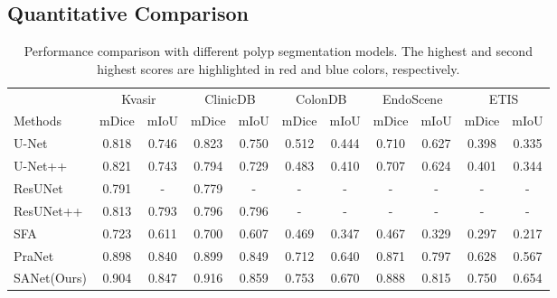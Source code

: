 \documentclass[runningheads]{llncs}
\begin{document}
\subsection{Quantitative Comparison}
\begin{table}[t]
\centering
\caption{Performance comparison with different polyp segmentation models. The highest and second highest scores are highlighted in red and blue colors, respectively.}
\label{tab:performace}
\renewcommand\arraystretch{1.2}
\renewcommand\tabcolsep{2pt}
\begin{tabular}{lcccccccccc}
    \hline
        & \multicolumn{2}{c}{Kvasir} & \multicolumn{2}{c}{ClinicDB} & \multicolumn{2}{c}{ColonDB} & \multicolumn{2}{c}{EndoScene} & \multicolumn{2}{c}{ETIS} \\
    \multirow{-2}{*}{Methods} & mDice & mIoU & mDice & mIoU & mDice & mIoU & mDice & mIoU & mDice & mIoU  \\ 
    \hline
    U-Net                       & 0.818 & 0.746 & 0.823 & 0.750 & 0.512 & 0.444 & 0.710 & 0.627 & 0.398 & 0.335 \\
    U-Net++                     & 0.821 & 0.743 & 0.794 & 0.729 & 0.483 & 0.410 & 0.707 & 0.624 & 0.401 & 0.344 \\
    ResUNet                     & 0.791 & -     & 0.779 & -     & -     & -     & -     & -     & -     & -     \\
    ResUNet++                   & 0.813 & 0.793 & 0.796 & 0.796 & -     & -     & -     & -     & -     & -     \\
    SFA                         & 0.723 & 0.611 & 0.700 & 0.607 & 0.469 & 0.347 & 0.467 & 0.329 & 0.297 & 0.217 \\
    PraNet                      & {\color[HTML]{3531FF} 0.898} & {\color[HTML]{3531FF} 0.840} & {\color[HTML]{3531FF} 0.899} &   {\color[HTML]{3531FF} 0.849} & {\color[HTML]{3531FF} 0.712} &  {\color[HTML]{3531FF} 0.640} & {\color[HTML]{3531FF} 0.871} & {\color[HTML]{3531FF} 0.797} & {\color[HTML]{3531FF} 0.628} & {\color[HTML]{3531FF} 0.567} \\
    \hline
    {\color[HTML]{FE0000} SANet(Ours)} & {\color[HTML]{FE0000} 0.904} &  {\color[HTML]{FE0000} 0.847} & {\color[HTML]{FE0000} 0.916} &  {\color[HTML]{FE0000} 0.859} & {\color[HTML]{FE0000} 0.753} & {\color[HTML]{FE0000} 0.670} & {\color[HTML]{FE0000} 0.888} &  {\color[HTML]{FE0000} 0.815} & {\color[HTML]{FE0000} 0.750} & {\color[HTML]{FE0000} 0.654} \\  
    \hline
\end{tabular}
\end{table}
\end{document}
